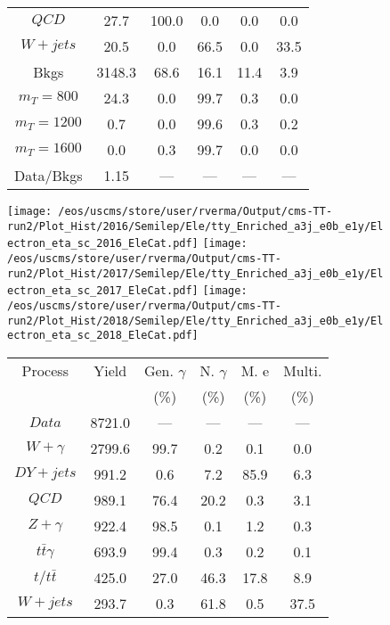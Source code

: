 \begin{figure}
\begin{minipage}[c]{0.32\textwidth}
{\begin{tabular}{cccccc}
$ QCD $ &  27.7 &  100.0 &  0.0 &  0.0 &  0.0\\
$ W+jets $ &  20.5 &  0.0 &  66.5 &  0.0 &  33.5\\
Bkgs &  3148.3 &  68.6 &  16.1 &  11.4 &  3.9\\
$ m_{T} = 800 $ &  24.3 &  0.0 &  99.7 &  0.3 &  0.0\\
$ m_{T} = 1200 $ &  0.7 &  0.0 &  99.6 &  0.3 &  0.2\\
$ m_{T} = 1600 $ &  0.0 &  0.3 &  99.7 &  0.0 &  0.0\\
Data/Bkgs &  1.15 &  --- &  --- &  --- &  ---\\
\hline
\end{tabular}
}
\end{minipage}
\end{figure}

\begin{figure}
\centering
\texttt{[image: /eos/uscms/store/user/rverma/Output/cms-TT-run2/Plot\_Hist/2016/Semilep/Ele/tty\_Enriched\_a3j\_e0b\_e1y/Electron\_eta\_sc\_2016\_EleCat.pdf]}
\texttt{[image: /eos/uscms/store/user/rverma/Output/cms-TT-run2/Plot\_Hist/2017/Semilep/Ele/tty\_Enriched\_a3j\_e0b\_e1y/Electron\_eta\_sc\_2017\_EleCat.pdf]}
\texttt{[image: /eos/uscms/store/user/rverma/Output/cms-TT-run2/Plot\_Hist/2018/Semilep/Ele/tty\_Enriched\_a3j\_e0b\_e1y/Electron\_eta\_sc\_2018\_EleCat.pdf]}
\begin{minipage}[c]{0.32\textwidth}
\centering
\tiny{
\begin{tabular}{cccccc}
\hline
Process & Yield & Gen. $\gamma$ & N. $\gamma$ & M. e & Multi. \\
 &  & (\%) & (\%) & (\%) & (\%)  \\
\hline
                                                                      $ Data $ &  8721.0 &  --- &  --- &  --- &  ---\\
$ W+\gamma $ &  2799.6 &  99.7 &  0.2 &  0.1 &  0.0\\
$ DY+jets $ &  991.2 &  0.6 &  7.2 &  85.9 &  6.3\\
$ QCD $ &  989.1 &  76.4 &  20.2 &  0.3 &  3.1\\
$ Z+\gamma $ &  922.4 &  98.5 &  0.1 &  1.2 &  0.3\\
$ t\bar{t}\gamma $ &  693.9 &  99.4 &  0.3 &  0.2 &  0.1\\
$ t/t\bar{t} $ &  425.0 &  27.0 &  46.3 &  17.8 &  8.9\\
$ W+jets $ &  293.7 &  0.3 &  61.8 &  0.5 &  37.5\\

\end{tabular}}
\end{minipage}
\end{figure}

